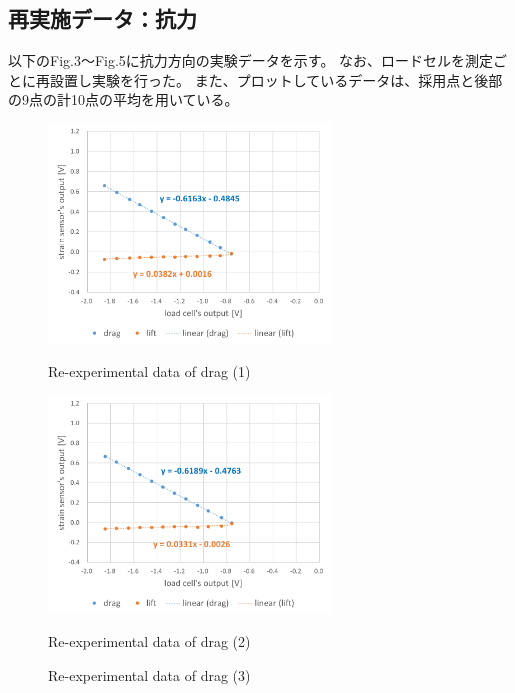 \documentclass[twocolumn,a4j]{jsarticle}
\begin{document}
\newpage
\subsection{再実施データ：抗力}
以下のFig.3～Fig.5に抗力方向の実験データを示す。
なお、ロードセルを測定ごとに再設置し実験を行った。
また、プロットしているデータは、採用点と後部の9点の計10点の平均を用いている。
\begin{figure}[htbp]
    \footnotesize
    \begin{center}
        \includegraphics[width=75mm]{../images/graph_21119_drag_1.png}
        \caption{Re-experimental data of drag (1)}
        \includegraphics[width=75mm]{../images/graph_21119_drag_2.png}
        \caption{Re-experimental data of drag (2)}
        \caption{Re-experimental data of drag (3)}
    \end{center}
\end{figure}

\newpage
\end{document}
